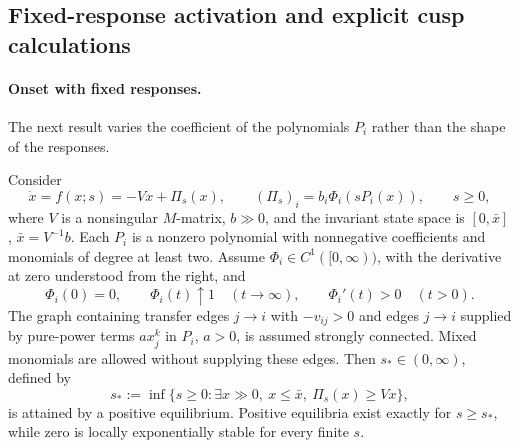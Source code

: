 \subsection{Fixed-response activation and explicit cusp calculations}

\paragraph{Onset with fixed responses.}
The next result varies the coefficient of the polynomials $P_i$ rather
than the shape of the responses.

\label{t:KBactivation}
Consider
\[
 \dot x=f(x;s)=-Vx+\Pi_s(x),\qquad
 (\Pi_s)_i=b_i\Phi_i(sP_i(x)),\qquad s\ge0,
\]
where $V$ is a nonsingular $M$-matrix, $b\gg0$, and the invariant
state space is $[0,\bar x]$, $\bar x=V^{-1}b$.
Each $P_i$ is a nonzero polynomial with nonnegative coefficients and
monomials of degree at least two. Assume
$\Phi_i\in C^1([0,\infty))$, with the derivative at zero understood from
the right, and
\[
 \Phi_i(0)=0,\qquad \Phi_i(t)\uparrow1\quad(t\to\infty),
 \qquad \Phi_i'(t)>0\quad(t>0).
\]
The graph containing transfer edges $j\to i$ with $-v_{ij}>0$ and
edges $j\to i$ supplied by pure-power terms $a x_j^k$ in $P_i$, $a>0$,
is assumed strongly connected. Mixed monomials are allowed without
supplying these edges. Then $s_*\in(0,\infty)$, defined by
\begin{equation}\label{eq:KB-activation}
 s_*:=\inf\{s\ge0:\exists x\gg0,\ x\le\bar x,\ \Pi_s(x)\ge Vx\},
\end{equation}
is attained by a positive equilibrium. Positive equilibria exist
exactly for $s\ge s_*$, while zero is locally exponentially stable
for every finite $s$.

